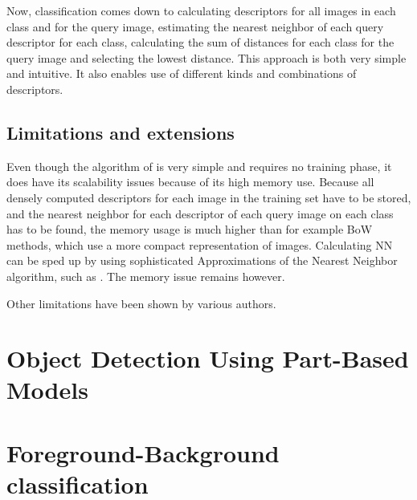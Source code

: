 \documentclass[a4paper,10pt]{article}
\begin{document}
Now, classification comes down to calculating descriptors for all images in each class and for the query image, estimating the nearest neighbor of each query descriptor for each class, calculating the sum of distances for each class for the query image and selecting the lowest distance. This approach is both very simple and intuitive. It also enables use of different kinds and combinations of descriptors.

\subsection{Limitations and extensions} %
\label{sub:limitations_and_extensions}

Even though the algorithm of \cite{boiman2008defense} is very simple and requires no training phase, it does have its scalability issues because of its high memory use. Because all densely computed descriptors for each image in the training set have to be stored, and the nearest neighbor for each descriptor of each query image on each class has to be found, the memory usage is much higher than for example BoW methods, which use a more compact representation of images. Calculating NN can be sped up by using sophisticated Approximations of the Nearest Neighbor algorithm, such as . The memory issue remains however.

Other limitations have been shown by various authors. \cite{behmo2010towards, wang2011improved,mccann2011local,tuytelaars2011nbnn,timofte2012iterative}



\section{Object Detection Using Part-Based Models} %
\label{sec:object_detection}


\section{Foreground-Background classification} %
\label{sec:foreground_background_classification}
\end{document}
